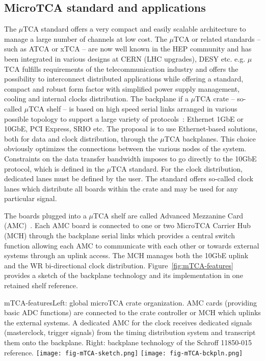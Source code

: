 \subsection{MicroTCA standard and applications}

The $\mu$TCA standard offers a very compact and easily scalable architecture to manage a large number of channels at low cost. The $\mu$TCA or related standards -- such as ATCA or xTCA -- are now well known in the HEP community and has been integrated in various designs at CERN (LHC upgrades), DESY etc. e.g.  $\mu$TCA fulfills requirements of the telecommunication industry and offers the possibility to interconnect distributed applications while offering a standard, compact and robust form factor with simplified power supply management, cooling and internal clocks distribution.
The backplane if a $\mu$TCA crate -- so-called $\mu$TCA shelf -- is based on high speed serial links arranged in various possible topology to support a large variety of protocols~: Ethernet 1GbE or 10GbE, PCI Express, SRIO etc. The proposal is to use Ethernet-based solutions, both for data and clock distribution, through the $\mu$TCA backplanes. This choice obviously optimizes the connections between the various nodes of the system. Constraints on the data transfer bandwidth imposes to go directly to the 10GbE protocol, which is defined in the $\mu$TCA standard. For the clock distribution, dedicated lanes must be defined by the user. The standard offers so-called clock lanes which distribute all boards within the crate and may be used for any particular signal. 

The boards plugged into a $\mu$TCA shelf are called Advanced Mezzanine Card (AMC)~\cite{picmg-2006}. Each AMC board is connected to one or two MicroTCA Carrier Hub (MCH) through the backplane serial links which provides a central switch function allowing each AMC to communicate with each other or towards external systems through an uplink access. The MCH manages both the 10GbE uplink and the WR bi-directional clock distribution.  
 Figure~\ref{fig:mTCA-features} provides a sketch of the backplane technology and its implementation in one retained shelf reference.

\begin{cdrfigure}{mTCA-features}{\small Left: global microTCA crate organization. AMC cards (providing basic ADC functions) are connected to the crate controller or MCH which uplinks the external systems. A dedicated AMC for the clock receives dedicated signals (masterclock, trigger signals) from the timing distribution system and transcript them onto the backplane. Right: backplane technology of the Schroff 11850-015 reference.}
\texttt{[image: fig-mTCA-sketch.png]}\hfill
\texttt{[image: fig-mTCA-bckpln.png]}
\end{cdrfigure}


